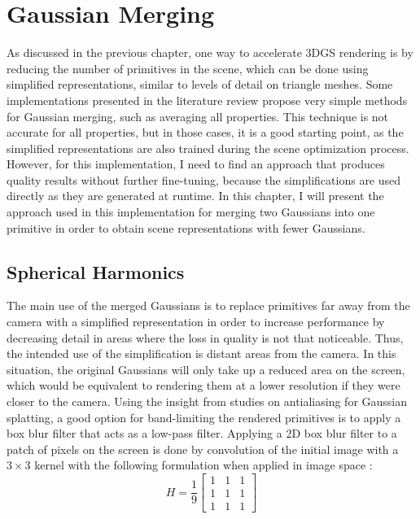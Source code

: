 \section{Gaussian Merging}
As discussed in the previous chapter, one way to accelerate 3DGS rendering is by reducing the number of primitives in the scene, which can be done using simplified representations, similar to levels of detail on triangle meshes. Some implementations presented in the literature review propose very simple methods for Gaussian merging, such as averaging all properties. This technique is not accurate for all properties, but in those cases, it is a good starting point, as the simplified representations are also trained during the scene optimization process. However, for this implementation, I need to find an approach that produces quality results without further fine-tuning, because the simplifications are used directly as they are generated at runtime. In this chapter, I will present the approach used in this implementation for merging two Gaussians into one primitive in order to obtain scene representations with fewer Gaussians.

\subsection{Spherical Harmonics}
The main use of the merged Gaussians is to replace primitives far away from the camera with a simplified representation in order to increase performance by decreasing detail in areas where the loss in quality is not that noticeable. Thus, the intended use of the simplification is distant areas from the camera. In this situation, the original Gaussians will only take up a reduced area on the screen, which would be equivalent to rendering them at a lower resolution if they were closer to the camera. Using the insight from studies on antialiasing for Gaussian splatting, a good option for band-limiting the rendered primitives is to apply a box blur filter that acts as a low-pass filter. Applying a 2D box blur filter to a patch of pixels on the screen is done by convolution of the initial image with a $3 \times 3$ kernel with the following formulation when applied in image space \cite{box_filter}: 
\[H = \frac{1}{9} \begin{bmatrix}
1 & 1 & 1\\
1 & 1 & 1\\
1 & 1 & 1
\end{bmatrix}\]

